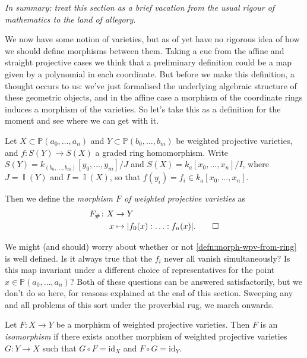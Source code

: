 \documentclass[10pt,notitlepage]{article}
\numberwithin{equation}{subsection}
\DeclareMathOperator{\ide}{\mathbb{I}}
\newcommand{\pee}{\mathbb{P}}
\newcommand{\kazn}{k_a[x_0,\ldots,x_n]}
\newcommand{\pazn}{\pee(a_0,\ldots,a_n)}
\newcommand{\id}{\mathrm{id}}
\begin{document}
    \emph{In summary: treat this section as a brief vacation from the usual rigour of mathematics to the land of allegory.}

    \bigskip

    We now have some notion of varieties, but as of yet have no rigorous idea of how we should define morphisms between them.
    Taking a cue from the affine and straight projective cases we think that a preliminary definition could be a map given by a polynomial in each coordinate.
    But before we make this definition, a thought occurs to us: we've just formalised the underlying algebraic structure of these geometric objects, and in the affine case a morphism of the coordinate rings induces a morphism of the varieties.
    So let's take this as a definition for the moment and see where we can get with it.

    \begin{definition}\label{defn:morph-wpv-from-ring}
        Let $X\subset\pazn$ and $Y\subset\pee(b_0,\ldots,b_m)$ be weighted projective varieties, and $f\colon S(Y)\to S(X)$ a graded ring homomorphism.
        Write $S(Y)=k_{(b_0,\ldots,b_m)}[y_0,\ldots,y_m]/J$ and $S(X)=\kazn/I$, where $J=\ide(Y)$ and $I=\ide(X)$, so that $f(y_i)=f_i\in\kazn$.

        Then we define the \emph{morphism $F$ of weighted projective varieties} as
        \begin{align*}
            F_\#\colon X&\to Y \\
            x&\mapsto |f_0(x):\ldots:f_n(x)|.\qedhere
        \end{align*}
    \end{definition}

    We might (and should) worry about whether or not \cref{defn:morph-wpv-from-ring} is well defined.
    Is it always true that the $f_i$ never all vanish simultaneously?
    Is this map invariant under a different choice of representatives for the point $x\in\pazn$?
    Both of these questions can be answered satisfactorily, but we don't do so here, for reasons explained at the end of this section.
    Sweeping any and all problems of this sort under the proverbial rug, we march onwards.

    \begin{definition}\label{defn:iso-wpv}
        Let $F\colon X\to Y$ be a morphism of weighted projective varieties.
        Then $F$ is an \emph{isomorphism} if there exists another morphism of weighted projective varieties $G\colon Y\to X$ such that $G\circ F=\id_X$ and $F\circ G=\id_Y$.
    \end{definition}
\end{document}
